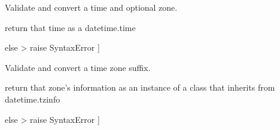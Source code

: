 \documentclass[letterpaper,10pt,english]{sphinxmanual}
\begin{document}
\begin{fulllineitems}
\label{\detokenize{api/killMS.Data:killMS.Data.sidereal.parseTime}}
\pysigstartsignatures
{}
\pysigstopsignatures
\sphinxAtStartPar
Validate and convert a time and optional zone.
\begin{description}
\sphinxlineitem{{[} s is a string \sphinxhyphen{}\textgreater{}}\begin{description}
\sphinxAtStartPar
return that time as a datetime.time

\end{description}

\sphinxAtStartPar
else \sphinxhyphen{}\textgreater{} raise SyntaxError {]}

\end{description}
\begin{quote}\begin{description}
\sphinxAtStartPar
{}

\end{description}\end{quote}

\end{fulllineitems}


\begin{fulllineitems}
\label{\detokenize{api/killMS.Data:killMS.Data.sidereal.parseZone}}
\pysigstartsignatures
{}
\pysigstopsignatures
\sphinxAtStartPar
Validate and convert a time zone suffix.
\begin{description}
\sphinxlineitem{{[} s is a string \sphinxhyphen{}\textgreater{}}\begin{description}
\sphinxAtStartPar
return that zone’s information as an instance of
a class that inherits from datetime.tzinfo

\end{description}

\sphinxAtStartPar
else \sphinxhyphen{}\textgreater{} raise SyntaxError {]}

\end{description}

\end{fulllineitems}
\end{document}
